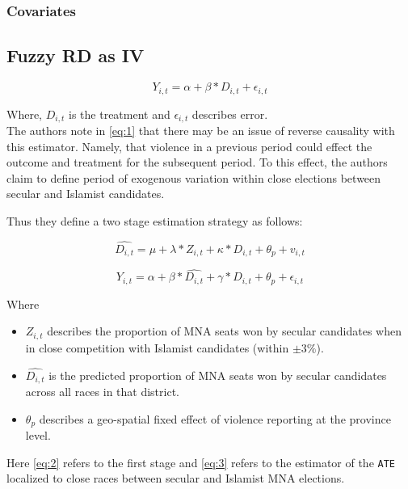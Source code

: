 \documentclass{scrartcl}
\begin{document}
\subsubsection{Covariates}

\subsection{Fuzzy RD as IV}

\begin{equation} \label{eq:1}
  Y_{i,t} = \alpha + \beta * D_{i,t} + \epsilon_{i,t}
\end{equation}

Where, $D_{i,t}$ is the treatment and $\epsilon_{i,t}$ describes error.\\

The authors note in \ref{eq:1} that there may be an issue of reverse causality with this estimator. Namely, that violence in a previous period could effect the outcome and treatment for the subsequent period.
To this effect, the authors claim to define period of exogenous variation within close elections between secular and Islamist candidates.

Thus they define a two stage estimation strategy as follows:


\begin{equation} \label{eq:2}
  \widehat{D_{i,t}} = \mu + \lambda * Z_{i,t} + \kappa*D_{i,t} + \theta_p + v_{i,t}
\end{equation}

\begin{equation} \label{eq:3}
  Y_{i,t} = \alpha + \beta * \widehat{D_{i,t}} + \gamma*D_{i,t} + \theta_{p} + \epsilon_{i,t}
\end{equation}

Where

\begin{itemize}
\item $Z_{i,t}$ describes the proportion of MNA seats won by secular candidates when in close competition with Islamist candidates (within $\pm 3\%$).
\item $\widehat{D_{i,t}}$ is the predicted proportion of MNA seats won by secular candidates across all races in that district.
\item $\theta_p$ describes a geo-spatial fixed effect of violence reporting at the province level. 
\end{itemize}

Here \ref{eq:2} refers to the first stage and \ref{eq:3} refers to the estimator of the \texttt{ATE} localized to close races between secular and Islamist MNA elections.  
\end{document}
